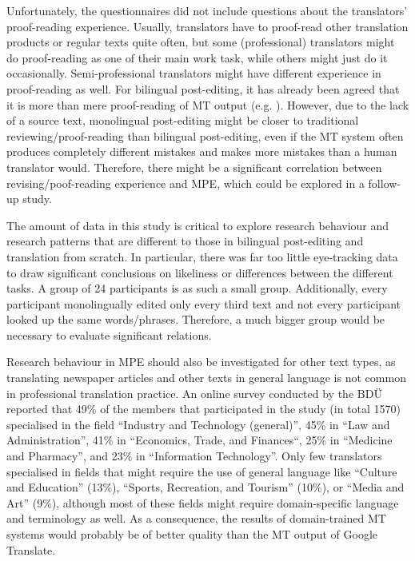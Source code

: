 \documentclass[output=paper]{langsci/langscibook}
\begin{document}
Unfortunately, the questionnaires did not include questions about the translators' proof-reading experience. Usually, translators have to proof-read other translation products or regular texts quite often, but some (professional) translators might do proof-reading as one of their main work task, while others might just do it occasionally. Semi-professional translators might have different experience in proof-reading as well. For bilingual post-editing, it has already been agreed that it is more than mere proof-reading of MT output (e.g. \citealt{obrien2002}). However, due to the lack of a source text, monolingual post-editing might be closer to traditional reviewing/proof-reading than bilingual post-editing, even if the MT system often produces completely different mistakes and makes more mistakes than a human translator would. Therefore, there might be a significant correlation between revising/poof-reading experience and MPE, which could be explored in a follow-up study.


The amount of data in this study is critical to explore research behaviour and research patterns that are different to those in bilingual post-editing and translation from scratch. In particular, there was far too little eye-tracking data to draw significant conclusions on likeliness or differences between the different tasks. A group of 24 participants is as such a small group. Additionally, every participant monolingually edited only every third text and not every participant looked up the same words/phrases. Therefore, a much bigger group would be necessary to evaluate significant relations.



Research behaviour in MPE should also be investigated for other text types, as translating newspaper articles and other texts in general language is not common in professional translation practice. An online survey \citep{Hommerich2011} conducted by the BDÜ reported that 49\% of the members that participated in the study (in total 1570) specialised in the field ``Industry and Technology (general)'', 45\% in ``Law and Administration'', 41\% in ``Economics, Trade, and Finances``, 25\% in ``Medicine and Pharmacy'', and 23\% in ``Information Technology''. Only few translators specialised in fields that might require the use of general language like ``Culture and Education'' (13\%), ``Sports, Recreation, and Tourism'' (10\%), or ``Media and Art'' (9\%), although most of these fields might require domain-specific language and terminology as well. As a consequence, the results of domain-trained MT systems would probably be of better quality than the MT output of Google Translate.
\end{document}
